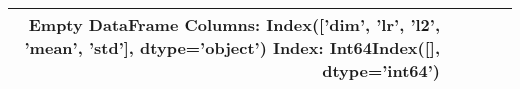 \begin{tabular}{rrrrr}
\toprule
Empty DataFrame
Columns: Index(['dim', 'lr', 'l2', 'mean', 'std'], dtype='object')
Index: Int64Index([], dtype='int64') \\
\bottomrule
\end{tabular}
